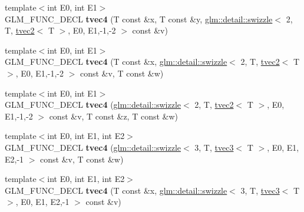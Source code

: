 \begin{DoxyCompactItemize}
\item 
\hypertarget{structglm_1_1detail_1_1tvec4_ae9a645660f570ca0e832fe401a611245}{}{\footnotesize template$<$int E0, int E1$>$ }\\G\+L\+M\+\_\+\+F\+U\+N\+C\+\_\+\+D\+E\+C\+L {\bfseries tvec4} (T const \&x, T const \&y, \hyperlink{structglm_1_1detail_1_1swizzle}{glm\+::detail\+::swizzle}$<$ 2, T, \hyperlink{structglm_1_1detail_1_1tvec2}{tvec2}$<$ T $>$, E0, E1,-\/1,-\/2 $>$ const \&v)\label{structglm_1_1detail_1_1tvec4_ae9a645660f570ca0e832fe401a611245}

\item 
\hypertarget{structglm_1_1detail_1_1tvec4_a94bb584377ca8a46ae35f855aed45483}{}{\footnotesize template$<$int E0, int E1$>$ }\\G\+L\+M\+\_\+\+F\+U\+N\+C\+\_\+\+D\+E\+C\+L {\bfseries tvec4} (T const \&x, \hyperlink{structglm_1_1detail_1_1swizzle}{glm\+::detail\+::swizzle}$<$ 2, T, \hyperlink{structglm_1_1detail_1_1tvec2}{tvec2}$<$ T $>$, E0, E1,-\/1,-\/2 $>$ const \&v, T const \&w)\label{structglm_1_1detail_1_1tvec4_a94bb584377ca8a46ae35f855aed45483}

\item 
\hypertarget{structglm_1_1detail_1_1tvec4_abd003ec43fbcc292214a4ce11fe93993}{}{\footnotesize template$<$int E0, int E1$>$ }\\G\+L\+M\+\_\+\+F\+U\+N\+C\+\_\+\+D\+E\+C\+L {\bfseries tvec4} (\hyperlink{structglm_1_1detail_1_1swizzle}{glm\+::detail\+::swizzle}$<$ 2, T, \hyperlink{structglm_1_1detail_1_1tvec2}{tvec2}$<$ T $>$, E0, E1,-\/1,-\/2 $>$ const \&v, T const \&z, T const \&w)\label{structglm_1_1detail_1_1tvec4_abd003ec43fbcc292214a4ce11fe93993}

\item 
\hypertarget{structglm_1_1detail_1_1tvec4_a4e9e3c73a1c3f3e7a545a0ed68819114}{}{\footnotesize template$<$int E0, int E1, int E2$>$ }\\G\+L\+M\+\_\+\+F\+U\+N\+C\+\_\+\+D\+E\+C\+L {\bfseries tvec4} (\hyperlink{structglm_1_1detail_1_1swizzle}{glm\+::detail\+::swizzle}$<$ 3, T, \hyperlink{structglm_1_1detail_1_1tvec3}{tvec3}$<$ T $>$, E0, E1, E2,-\/1 $>$ const \&v, T const \&w)\label{structglm_1_1detail_1_1tvec4_a4e9e3c73a1c3f3e7a545a0ed68819114}

\item 
\hypertarget{structglm_1_1detail_1_1tvec4_ac8d88c6d34185e88a78cd496114fff8f}{}{\footnotesize template$<$int E0, int E1, int E2$>$ }\\G\+L\+M\+\_\+\+F\+U\+N\+C\+\_\+\+D\+E\+C\+L {\bfseries tvec4} (T const \&x, \hyperlink{structglm_1_1detail_1_1swizzle}{glm\+::detail\+::swizzle}$<$ 3, T, \hyperlink{structglm_1_1detail_1_1tvec3}{tvec3}$<$ T $>$, E0, E1, E2,-\/1 $>$ const \&v)\label{structglm_1_1detail_1_1tvec4_ac8d88c6d34185e88a78cd496114fff8f}


\end{DoxyCompactItemize}
